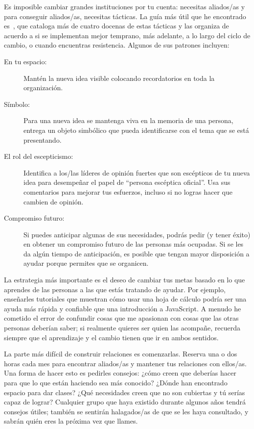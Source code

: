 Es imposible cambiar grandes instituciones por tu cuenta:
necesitas aliados/as
y para conseguir aliados/as,
necesitas tácticas.
La guía más útil que he encontrado es~\cite{Mann2015}, 
que cataloga más de cuatro docenas de estas tácticas
y las organiza de acuerdo a si se implementan mejor temprano,
más adelante,
a lo largo del ciclo de cambio,
o cuando encuentras resistencia.
Algunos de sus patrones incluyen:

\begin{description}

\item[En tu espacio:]
Mantén la nueva idea visible
colocando recordatorios en toda la organización.

\item[Símbolo:] 
Para una nueva idea se mantenga viva en la memoria de una persona,
entrega un objeto simbólico  que pueda identificarse con el tema que se está presentando.

\item[El rol del escepticismo:]
Identifica a los/las líderes de opinión fuertes que son escépticos de tu nueva 
idea para desempeñar el papel de ``persona escéptica oficial''.
Usa sus comentarios para mejorar tus esfuerzos,
incluso si no logras hacer que cambien de opinión.

\item[Compromiso futuro:]
Si puedes anticipar algunas de sus necesidades,
podrás pedir (y tener éxito) en obtener un compromiso 
futuro de las personas más ocupadas.
Si se les da algún tiempo de anticipación, 
es posible que tengan mayor disposición a ayudar
porque permites que se organicen.

\end{description}

La estrategia más importante es
el deseo de cambiar tus metas
basado en lo que aprendes de las personas a las que estás tratando de ayudar.
Por ejemplo, enseñarles tutoriales que muestran cómo usar una hoja de cálculo
podría ser una ayuda más rápida y confiable que 
una introducción a JavaScript.
A menudo he cometido el error de confundir cosas que me apasionan
con cosas que las otras personas deberían saber;
si realmente quieres ser quien las acompañe,
recuerda siempre que el aprendizaje y el cambio tienen que ir en ambos sentidos.

La parte más difícil de construir relaciones es comenzarlas.
Reserva una o dos horas cada mes
para encontrar aliados/as y mantener tus relaciones con ellos/as.
Una forma de hacer esto es pedirles consejos:
¿cómo creen que deberías hacer para que lo que están haciendo sea más conocido?
¿Dónde han encontrado espacio para dar clases?
¿Qué necesidades creen que no son cubiertas
y tú serías capaz de lograr?
Cualquier grupo que haya existido durante algunos años tendrá consejos útiles;
también se sentirán halagados/as de que se les haya consultado,
y sabrán quién eres la próxima vez que llames.


